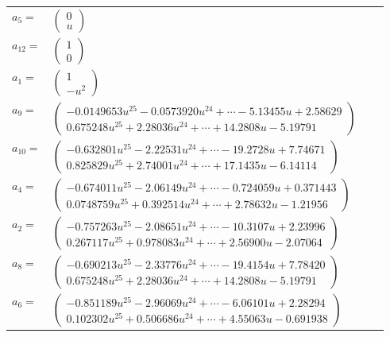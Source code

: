 \documentclass[1p]{elsarticle_modified}
\theoremstyle{definition}
\begin{document}
\begin{tabular}{m{7pt} m{180pt} m{7pt} m{180pt} }
\flushright $a_{5}=$&$\begin{pmatrix}0\\u\end{pmatrix}$ \\
\flushright $a_{12}=$&$\begin{pmatrix}1\\0\end{pmatrix}$ \\
\flushright $a_{1}=$&$\begin{pmatrix}1\\- u^2\end{pmatrix}$ \\
\flushright $a_{9}=$&$\begin{pmatrix}-0.0149653 u^{25}-0.0573920 u^{24}+\cdots-5.13455 u+2.58629\\0.675248 u^{25}+2.28036 u^{24}+\cdots+14.2808 u-5.19791\end{pmatrix}$ \\
\flushright $a_{10}=$&$\begin{pmatrix}-0.632801 u^{25}-2.22531 u^{24}+\cdots-19.2728 u+7.74671\\0.825829 u^{25}+2.74001 u^{24}+\cdots+17.1435 u-6.14114\end{pmatrix}$ \\
\flushright $a_{4}=$&$\begin{pmatrix}-0.674011 u^{25}-2.06149 u^{24}+\cdots-0.724059 u+0.371443\\0.0748759 u^{25}+0.392514 u^{24}+\cdots+2.78632 u-1.21956\end{pmatrix}$ \\
\flushright $a_{2}=$&$\begin{pmatrix}-0.757263 u^{25}-2.08651 u^{24}+\cdots-10.3107 u+2.23996\\0.267117 u^{25}+0.978083 u^{24}+\cdots+2.56900 u-2.07064\end{pmatrix}$ \\
\flushright $a_{8}=$&$\begin{pmatrix}-0.690213 u^{25}-2.33776 u^{24}+\cdots-19.4154 u+7.78420\\0.675248 u^{25}+2.28036 u^{24}+\cdots+14.2808 u-5.19791\end{pmatrix}$ \\
\flushright $a_{6}=$&$\begin{pmatrix}-0.851189 u^{25}-2.96069 u^{24}+\cdots-6.06101 u+2.28294\\0.102302 u^{25}+0.506686 u^{24}+\cdots+4.55063 u-0.691938\end{pmatrix}$ \\

\end{tabular}
\end{document}
